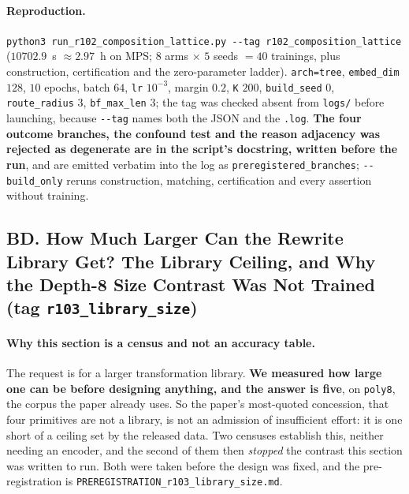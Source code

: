 \paragraph{Reproduction.} \texttt{python3 run\_r102\_composition\_lattice.py -{}-tag r102\_composition\_lattice} ($10702.9$~s $\approx2.97$~h on MPS; $8$ arms $\times$ $5$ seeds $=40$ trainings, plus construction, certification and the zero-parameter ladder). \texttt{arch=tree}, \texttt{embed\_dim} $128$, $10$ epochs, batch $64$, \texttt{lr} $10^{-3}$, margin $0.2$, \texttt{K} $200$, \texttt{build\_seed} $0$, \texttt{route\_radius} $3$, \texttt{bf\_max\_len} $3$; the tag was checked absent from \texttt{logs/} before launching, because \texttt{-{}-tag} names both the JSON and the \texttt{.log}. \textbf{The four outcome branches, the confound test and the reason adjacency was rejected as degenerate are in the script's docstring, written before the run}, and are emitted verbatim into the log as \texttt{preregistered\_branches}; \texttt{-{}-build\_only} reruns construction, matching, certification and every assertion without training.

\subsection*{BD. How Much Larger Can the Rewrite Library Get? The Library Ceiling, and Why the Depth-8 Size Contrast Was Not Trained (tag \texttt{r103\_library\_size})}

\paragraph{Why this section is a census and not an accuracy table.} The request is for a larger transformation library. \textbf{We measured how large one can be before designing anything, and the answer is five}, on \texttt{poly8}, the corpus the paper already uses. So the paper's most-quoted concession, that four primitives are not a library, is not an admission of insufficient effort: it is one short of a ceiling set by the released data. Two censuses establish this, neither needing an encoder, and the second of them then \emph{stopped} the contrast this section was written to run. Both were taken before the design was fixed, and the pre-registration is \texttt{PREREGISTRATION\_r103\_library\_size.md}.

